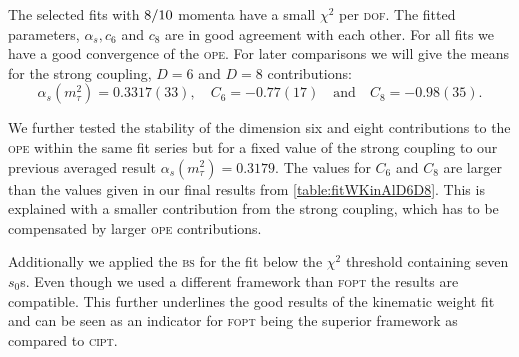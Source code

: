 \documentclass[../../index.tex]{subfiles}
\begin{document}
The selected fits with \(8\-/10\) momenta have a small \(\chi^2\) per
\textsc{dof}. The fitted parameters, \(\alpha_s, c_6\) and \(c_8\) are in good
agreement with each other. For all fits we have a good convergence of the
\textsc{ope}. For later comparisons we will give the means for the strong
coupling, \(D=6\) and \(D=8\) contributions:
\begin{equation}
  \label{eq:wKinResult}
  \alpha_s(m_\tau^2) = 0.3317(33), \quad C_6 = -0.77(17) \quad \text{and} \quad
  C_8 = -0.98(35).
\end{equation}

We further tested the stability of the dimension six and eight contributions to
the \textsc{ope} within the same fit series but for a fixed value of the strong
coupling to our previous averaged result \(\alpha_s(m_\tau^2)=0.3179\). The
values for \(C_6\) and \(C_8\) are larger than the values given in our final
results from \cref{table:fitWKinAlD6D8}. This is explained with a smaller
contribution from the strong coupling, which has to be compensated by larger
\textsc{ope} contributions.

Additionally we applied the \textsc{bs} for the fit below the \(\chi^2\)
threshold containing seven \(s_0\)s. Even though we used a different framework
than \textsc{fopt} the results are compatible. This further underlines the good
results of the kinematic weight fit and can be seen as an indicator for
\textsc{fopt} being the superior framework as compared to \textsc{cipt}. 
\end{document}

